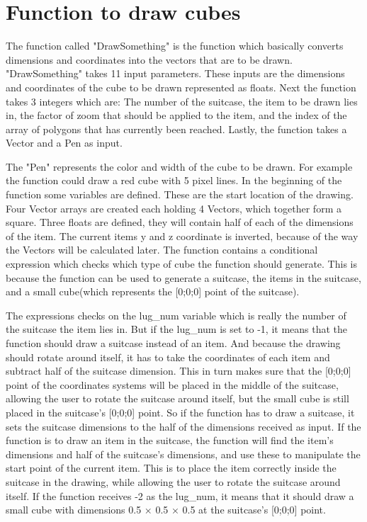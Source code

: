 \section{Function to draw cubes}
\label{sec:cube}
The function called "DrawSomething" is the function which basically converts dimensions and coordinates into the vectors that are to be drawn.
"DrawSomething" takes 11 input parameters. These inputs are the dimensions and coordinates of the cube to be drawn represented as floats. Next the function takes 3 integers which are: The number of the suitcase, the item to be drawn lies in, the factor of zoom that should be applied to the item, and the index of the array of polygons that has currently been reached. Lastly, the function takes a Vector and a Pen as input.

The "Pen" represents the color and width of the cube to be drawn. For example the function could draw a red cube with 5 pixel lines. In the beginning of the function some variables are defined. These are the start location of the drawing. Four Vector arrays are created each holding 4 Vectors, which together form a square.
Three floats are defined, they will contain half of each of the dimensions of the item.
The current items y and z coordinate is inverted, because of the way the Vectors will be calculated later. 
The function contains a conditional expression which checks which type of cube the function should generate. This is because the function can be used to generate a suitcase, the items in the suitcase, and a small cube(which represents the [0;0;0] point of the suitcase). 

The expressions checks on the lug\_num variable which is really the number of the suitcase the item lies in. But if the lug\_num is set to -1, it means that the function should draw a suitcase instead of an item. And because the drawing should rotate around itself, it has to take the coordinates of each item and subtract half of the suitcase dimension. This in turn makes sure that the [0;0;0] point of the coordinates systems will be placed in the middle of the suitcase, allowing the user to rotate the suitcase around itself, but the small cube is still placed in the suitcase's [0;0;0] point.
So if the function has to draw a suitcase, it sets the suitcase dimensions to the half of the dimensions received as input.
If the function is to draw an item in the suitcase, the function will find the item's dimensions and half of the suitcase's dimensions, and use these to manipulate the start point of the current item. This is to place the item correctly inside the suitcase in the drawing, while allowing the user to rotate the suitcase around itself. 
If the function receives -2 as the lug\_num, it means that it should draw a small cube with dimensions 0.5 × 0.5 × 0.5 at the suitcase's [0;0;0] point.

